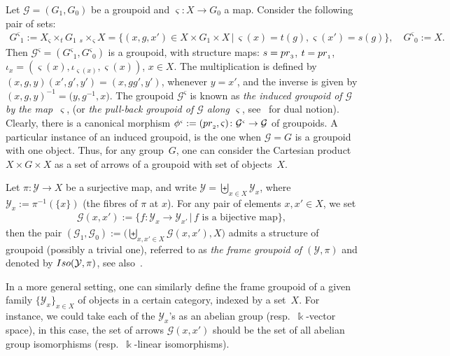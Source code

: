 \documentclass[11pt]{article}
\numberwithin{equation}{section}
\newcommand{\Go}{\cG_{\Sscript{0}}}
\newcommand{\Ga}{\cG_{\Sscript{1}}}
\newcommand{\cG}{{\mathcal G}}
\newcommand{\cY}{{\mathcal Y}}
\newcommand{\Sscript}[1]{\scriptscriptstyle{#1}}
\newcommand{\due}[3]{{}_{{#2 }} {#1}_{{ #3}} }
\begin{document}
\begin{Example}\label{exam:induced}Let $\cG=(G_{\Sscript{1}}, G_{\Sscript{0}})$ be a groupoid and $\varsigma\colon X \to G_{\Sscript{0}}$ a map. Consider the following pair of sets:
\begin{gather*}
G^{\Sscript{\varsigma}}{}_{\Sscript{1}}:= X \due \times {\Sscript{\varsigma}} { \Sscript{t}} G_{\Sscript{1}} \; \due \times {\Sscript{s}} { \Sscript{\varsigma}} X= \big\{ (x,g,x')
\in X\times G_{\Sscript{1}}\times X\,| \, \varsigma(x)=t(g), \varsigma(x')=s(g) \big\}, \quad G^{\Sscript{\varsigma}}{}_{\Sscript{0}}:=X.
\end{gather*}
Then $\cG^{\Sscript{\varsigma}}{}=(G^{\Sscript{\varsigma}}{}_{\Sscript{1}}, G^{\Sscript{\varsigma}}{}_{\Sscript{0}})$ is a groupoid, with structure maps: $s= {\rm pr}_{\Sscript{3}}$, $t= {\rm pr}_{\Sscript{1}}$, $\iota_{\Sscript{x}}=(\varsigma(x), \iota_{\Sscript{\varsigma(x)}}, \varsigma(x))$, $x \in X$. The multiplication is defined by $(x,g,y) (x',g',y')= ( x,gg',y')$, whenever $y=x'$, and the inverse is given by $(x,g,y)^{-1}=\big(y,g^{-1},x\big)$. The groupoid $\cG^{\Sscript{\varsigma}}$ is known as \emph{the induced groupoid of $\cG$ by the map~$\varsigma$}, (or \emph{the
pull-back groupoid of $\cG$ along $\varsigma$}, see~\cite{Higgins:1971} for dual notion). Clearly, there is a canonical morphism $\phi^{\Sscript{\varsigma}}:=({\rm pr}_{\Sscript{2}},
\varsigma)\colon \cG^{\Sscript{\varsigma}} \to \cG$ of groupoids. A particular instance of an induced groupoid, is the one when $\cG=G$ is a groupoid with one object. Thus, for any group~$G$, one can consider the Cartesian product $X \times G \times X$ as a set of arrows of a groupoid with set of objects~$X$.
\end{Example}

\begin{Example}\label{exam:frame}Let $\pi\colon \cY \to X$ be a surjective map, and write $\cY =\biguplus_{\Sscript{ x \in X }} \cY_{\Sscript{x}}$, where $\cY_{\Sscript{x}}:=\pi^{-1}(\{x\})$ (the fibres of $\pi$ at $x$). For any pair of elements $x, x' \in X$, we set
\begin{gather*}
\cG(x,x'):=\big\{ f \colon \cY_{\Sscript{x}} \to \cY_{\Sscript{x'}}\,|\, f \text{ is a bijective map} \big\},
\end{gather*}
then the pair $(\Ga, \Go):=\big(\biguplus_{\Sscript{x, x' \in X}} \cG(x,x'), X\big)$ admits a structure of groupoid (possibly a trivial one), referred to as \emph{the frame groupoid of $(\cY, \pi)$} and denoted by ${\rm Iso}(\cY, \pi)$, see also~\cite{Renault:1980}.

In a more general setting, one can similarly define the frame groupoid of a given family $\{\cY_{\Sscript{x}}\}_{x \in X}$ of objects in a certain category, indexed by a set~$X$. For instance, we could take each of the $\cY_{\Sscript{x}}$'s as an abelian group (resp.~$\Bbbk$-vector space), in this case, the set of arrows $\cG(x,x')$ should be the set of all abelian group isomorphisms (resp.~$\Bbbk$-linear isomorphisms).
\end{Example}
\end{document}

